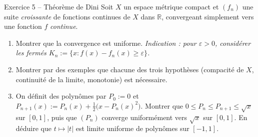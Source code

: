 \documentclass[11pt,a4paper]{article}
\newcommand{\R}{\mathbb{R}}
\theoremstyle{definition}
\begin{document}
\begin{exo}{Exercice 5 -- Théorème de Dini}
Soit $X$ un espace métrique compact et $(f_n)$ une suite \emph{croissante} de fonctions continues de $X$ dans $\R$, convergeant simplement vers une fonction $f$ \emph{continue}.
\begin{enumerate}[label=(\alph*)]
  \item Montrer que la convergence est uniforme. \emph{Indication : pour $\varepsilon>0$, considérer les fermés $K_n:=\{x:f(x)-f_n(x)\ge\varepsilon\}$.}
  \item Montrer par des exemples que chacune des trois hypothèses (compacité de $X$, continuité de la limite, monotonie) est nécessaire.
  \item On définit des polynômes par $P_0:=0$ et $P_{n+1}(x):=P_n(x)+\frac12\big(x-P_n(x)^2\big)$. Montrer que $0\le P_n\le P_{n+1}\le\sqrt x$ sur $[0,1]$, puis que $(P_n)$ converge uniformément vers $\sqrt x$ sur $[0,1]$. En déduire que $t\mapsto|t|$ est limite uniforme de polynômes sur $[-1,1]$.
\end{enumerate}
\end{exo}
\end{document}
